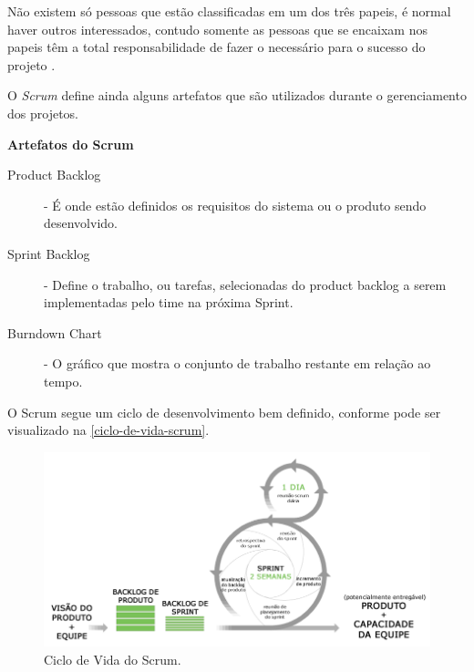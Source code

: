 \documentclass[
	article,			%
	11pt,				%
	oneside,			%
	a4paper,			%
	english,			%
	brazil,				%
	sumario=tradicional
	]{abntex2}
\begin{document}
Não existem só pessoas que estão classificadas em um dos três papeis, é normal
haver outros interessados, contudo somente as pessoas que se encaixam nos
papeis têm a total responsabilidade de fazer o necessário para o sucesso do
projeto \cite{schwaber2002agile}.

O \textit{Scrum} define ainda alguns artefatos que são utilizados durante o
gerenciamento dos projetos.

\textbf{Artefatos do Scrum}

\begin{description}
   \item[Product Backlog] - É onde estão definidos os requisitos do sistema ou o
   produto sendo desenvolvido.
   \item[Sprint Backlog] - Define o trabalho, ou tarefas, selecionadas do
   product backlog a serem implementadas pelo time na próxima Sprint.
   \item[Burndown Chart] - O gráfico que mostra o conjunto de trabalho restante
   em relação ao tempo.
\end{description}



O Scrum segue um ciclo de desenvolvimento bem definido, conforme pode ser
visualizado na \autoref{ciclo-de-vida-scrum}.

\begin{figure}[htb]
   \caption{Ciclo de Vida do Scrum.}
   \label{ciclo-de-vida-scrum}
   \begin{center}
       \includegraphics[scale=0.4]{ciclodevidascrum.png}
   \end{center}
\end{figure}
\end{document}
